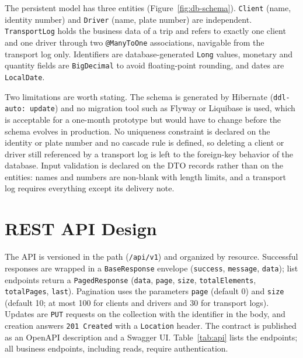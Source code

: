 The persistent model has three entities (Figure~\ref{fig:db-schema}). \texttt{Client} (name, identity number) and \texttt{Driver} (name, plate number) are independent. \texttt{TransportLog} holds the business data of a trip and refers to exactly one client and one driver through two \texttt{@ManyToOne} associations, navigable from the transport log only. Identifiers are database-generated \texttt{Long} values, monetary and quantity fields are \texttt{BigDecimal} to avoid floating-point rounding, and dates are \texttt{LocalDate}.



Two limitations are worth stating. The schema is generated by Hibernate (\texttt{ddl-auto: update}) and no migration tool such as Flyway or Liquibase is used, which is acceptable for a one-month prototype but would have to change before the schema evolves in production. No uniqueness constraint is declared on the identity or plate number and no cascade rule is defined, so deleting a client or driver still referenced by a transport log is left to the foreign-key behavior of the database. Input validation is declared on the DTO records rather than on the entities: names and numbers are non-blank with length limits, and a transport log requires everything except its delivery note.

\section{REST API Design}

The API is versioned in the path (\texttt{/api/v1}) and organized by resource. Successful responses are wrapped in a \texttt{BaseResponse} envelope (\texttt{success}, \texttt{message}, \texttt{data}); list endpoints return a \texttt{PagedResponse} (\texttt{data}, \texttt{page}, \texttt{size}, \texttt{totalElements}, \texttt{totalPages}, \texttt{last}). Pagination uses the parameters \texttt{page} (default 0) and \texttt{size} (default 10; at most 100 for clients and drivers and 30 for transport logs). Updates are \texttt{PUT} requests on the collection with the identifier in the body, and creation answers \texttt{201 Created} with a \texttt{Location} header. The contract is published as an OpenAPI description and a Swagger UI. Table~\ref{tab:api} lists the endpoints; all business endpoints, including reads, require authentication.

